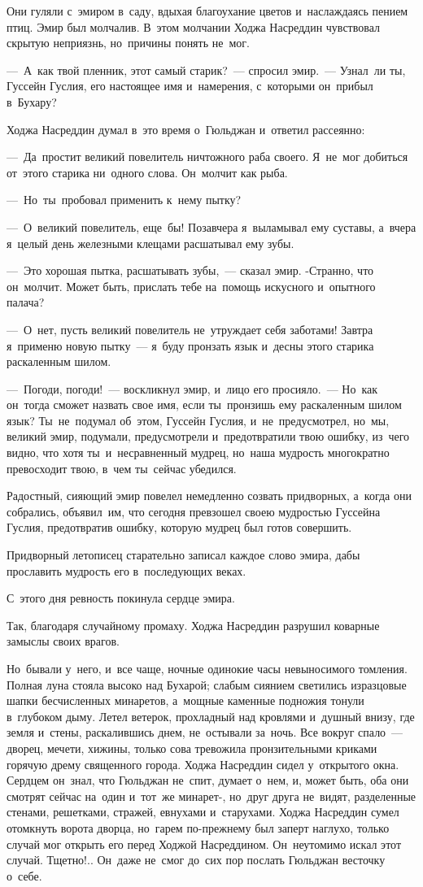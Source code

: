 \documentclass[12pt,a4paper]{book}
\begin{document}
Они гуляли с~эмиром в~саду, вдыхая благоухание цветов и~наслаждаясь пением птиц. Эмир был молчалив. В~этом молчании Ходжа Насреддин чувствовал скрытую неприязнь, но~причины понять не~мог.

—~А~как твой пленник, этот самый старик?~— спросил эмир.~— Узнал~ли ты, Гуссейн Гуслия, его настоящее имя и~намерения, с~которыми он~прибыл в~Бухару?

Ходжа Насреддин думал в~это время о~Гюльджан и~ответил рассеянно:

—~Да~простит великий повелитель ничтожного раба своего. Я~не~мог добиться от~этого старика ни~одного слова. Он~молчит как рыба.

—~Но~ты~пробовал применить к~нему пытку?

—~О~великий повелитель, еще~бы! Позавчера я~выламывал ему суставы, а~вчера я~целый день железными клещами расшатывал ему зубы.

—~Это хорошая пытка, расшатывать зубы,~— сказал эмир. -Странно, что он~молчит. Может быть, прислать тебе на~помощь искусного и~опытного палача?

—~О~нет, пусть великий повелитель не~утруждает себя заботами! Завтра я~применю новую пытку~— я~буду пронзать язык и~десны этого старика раскаленным шилом.

—~Погоди, погоди!~— воскликнул эмир, и~лицо его просияло.~— Но~как он~тогда сможет назвать свое имя, если ты~пронзишь ему раскаленным шилом язык? Ты~не~подумал об~этом, Гуссейн Гуслия, и~не~предусмотрел, но~мы, великий эмир, подумали, предусмотрели и~предотвратили твою ошибку, из~чего видно, что хотя ты~и~несравненный мудрец, но~наша мудрость многократно превосходит твою, в~чем ты~сейчас убедился.

Радостный, сияющий эмир повелел немедленно созвать придворных, а~когда они собрались, объявил~им, что сегодня превзошел своею мудростью Гуссейна Гуслия, предотвратив ошибку, которую мудрец был готов совершить.

Придворный летописец старательно записал каждое слово эмира, дабы прославить мудрость его в~последующих веках.

С~этого дня ревность покинула сердце эмира.

Так, благодаря случайному промаху. Ходжа Насреддин разрушил коварные замыслы своих врагов.

Но~бывали у~него, и~все чаще, ночные одинокие часы невыносимого томления. Полная луна стояла высоко над Бухарой; слабым сиянием светились изразцовые шапки бесчисленных минаретов, а~мощные каменные подножия тонули в~глубоком дыму. Летел ветерок, прохладный над кровлями и~душный внизу, где земля и~стены, раскалившись днем, не~остывали за~ночь. Все вокруг спало~— дворец, мечети, хижины, только сова тревожила пронзительными криками горячую дрему священного города. Ходжа Насреддин сидел у~открытого окна. Сердцем он~знал, что Гюльджан не~спит, думает о~нем, и, может быть, оба они смотрят сейчас на~один и~тот~же минарет-, но~друг друга не~видят, разделенные стенами, решетками, стражей, евнухами и~старухами. Ходжа Насреддин сумел отомкнуть ворота дворца, но~гарем по-прежнему был заперт наглухо, только случай мог открыть его перед Ходжой Насреддином. Он~неутомимо искал этот случай. Тщетно!.. Он~даже не~смог до~сих пор послать Гюльджан весточку о~себе.
\end{document}
